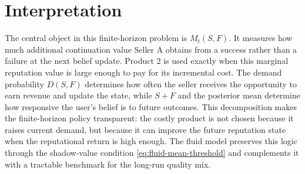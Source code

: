 \documentclass[opre]{informs3}
\begin{document}
\section{Interpretation}

The central object in this finite-horizon problem is $M_t(S,F)$. It measures how
much additional continuation value Seller A obtains from a success rather than a
failure at the next belief update. Product 2 is used exactly when this marginal
reputation value is large enough to pay for its incremental cost. The demand
probability $D(S,F)$ determines how often the seller receives the opportunity to
earn revenue and update the state, while $S+F$ and the posterior mean determine
how responsive the user's belief is to future outcomes. This decomposition makes
the finite-horizon policy transparent: the costly product is not chosen because
it raises current demand, but because it can improve the future reputation state
when the reputational return is high enough. The fluid model preserves this
logic through the shadow-value condition
\cref{eq:fluid-mean-threshold} and complements it with a tractable benchmark for
the long-run quality mix.
\end{document}
